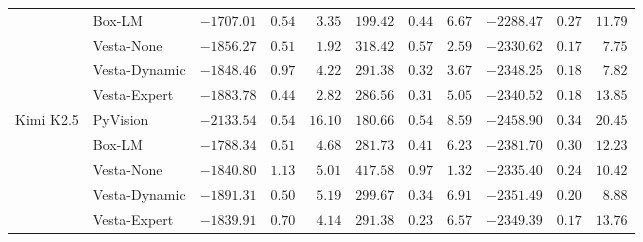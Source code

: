 \documentclass{article}
\newcommand{\method}{{\sc Vesta}}
\begin{document}
\begin{table}[ht]
\begin{tabular}{ll rrr rrr rrr}
        & Box-LM           & $\mathbf{-1707.01}$ & $0.54$          & $3.35$          & $199.42$           & $0.44$          & $6.67$          & $\mathbf{-2288.47}$ & $0.27$          & $11.79$         \\
        & \method{}-None    & $-1856.27$           & $0.51$          & $\mathbf{1.92}$ & $\mathbf{318.42}$ & $0.57$          & $\mathbf{2.59}$ & $-2330.62$           & $\mathbf{0.17}$ & $\mathbf{7.75}$ \\
        & \method{}-Dynamic & $-1848.46$           & $0.97$          & $4.22$          & $291.38$           & $0.32$          & $3.67$          & $-2348.25$           & $0.18$          & $7.82$          \\
        & \method{}-Expert  & $-1883.78$           & $\mathbf{0.44}$ & $2.82$          & $286.56$           & $\mathbf{0.31}$ & $5.05$          & $-2340.52$           & $0.18$          & $13.85$         \\
      \hline
      \multirow{5}{*}{Kimi K2.5}
        & PyVision         & $-2133.54$           & $0.54$          & $16.10$         & $180.66$           & $0.54$          & $8.59$          & $-2458.90$          & $0.34$          & $20.45$         \\
        & Box-LM           & $\mathbf{-1788.34}$ & $0.51$          & $4.68$          & $281.73$           & $0.41$          & $6.23$          & $-2381.70$          & $0.30$          & $12.23$         \\
        & \method{}-None    & $-1840.80$           & $1.13$          & $5.01$          & $\mathbf{417.58}$ & $0.97$          & $\mathbf{1.32}$ & $\mathbf{-2335.40}$ & $0.24$          & $10.42$         \\
        & \method{}-Dynamic & $-1891.31$           & $\mathbf{0.50}$ & $5.19$          & $299.67$           & $0.34$          & $6.91$          & $-2351.49$          & $0.20$          & $\mathbf{8.88}$ \\
        & \method{}-Expert  & $-1839.91$           & $0.70$          & $\mathbf{4.14}$ & $291.38$           & $\mathbf{0.23}$ & $6.57$         & $-2349.39$          & $\mathbf{0.17}$ & $13.76$         \\
      \hline\hline
    \end{tabular}
\end{table}
\end{document}
